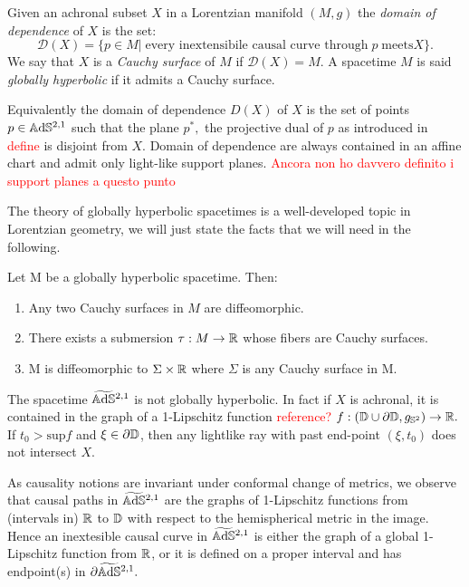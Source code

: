 \begin{definition}
    Given an achronal subset $X$ in a Lorentzian manifold $(M,g)$ the \textit{domain of dependence} of $X$ is the set: 
    \[
        \mathcal{D}(X)=\{p\in M |\;\text{every inextensibile causal curve through}\; p\; \text{meets} X \}.
    \]
    We say that $X$ is a \textit{Cauchy surface} of $M$ if $\mathcal{D}(X)=M$. A spacetime $M$ is said \textit{globally hyperbolic} if it admits a Cauchy surface.
\end{definition}

\begin{observation}
    Equivalently the domain of dependence  $D(X)$ of $X$ is the set of points $p\in\mathbb{A}\mathrm{d}\mathbb{S}^{2,1}$ such that the plane $p^*,$ the projective dual of $p$ as introduced in \textcolor{red}{define} is disjoint from $X.$ Domain of dependence are always contained in an affine chart and admit only light-like support planes. \textcolor{red}{Ancora non ho davvero definito i support planes a questo punto}
\end{observation}

The theory of globally hyperbolic spacetimes is a well-developed topic in Lorentzian geometry, we will just state the facts that we will need in the following. 

\begin{theorem}
    Let M be a globally hyperbolic spacetime. Then:
    \begin{enumerate}
        \item Any two Cauchy surfaces in $M$ are diffeomorphic. 
        \item There exists a submersion $\tau:M\to\mathbb{R}$ whose fibers are Cauchy surfaces.
        \item M is diffeomorphic to $\Sigma\times\mathbb{R}$ where $\Sigma$ is any Cauchy surface in M.
    \end{enumerate}
\end{theorem}

\begin{observation}
    The spacetime $\widetilde{\mathbb{A}\mathrm{d}\mathbb{S}}{}^{2,1}$ is not globally hyperbolic. In fact if $X$ is achronal, it is contained in the graph of a 1-Lipschitz function \textcolor{red}{reference?} $f:(\mathbb{D}\cup\partial\mathbb{D},g_{\mathbb{S}^2})\to\mathbb{R}.$ If $t_0>\text{sup}f$ and $\xi \in \partial\mathbb{D}$, then any lightlike ray with past end-point $(\xi,t_0)$ does not intersect $X.$ 
\end{observation}

\begin{observation}
    As causality notions are invariant under conformal change of metrics, we observe that causal paths in $\widetilde{\mathbb{A}\mathrm{d}\mathbb{S}}{}^{2,1}$ are the graphs of 1-Lipschitz functions from (intervals in) $\mathbb{R}$ to $\mathbb{D}$ with respect to the hemispherical metric in the image. Hence an inextesible causal curve in $\widetilde{\mathbb{A}\mathrm{d}\mathbb{S}}{}^{2,1}$ is either the graph of a global 1-Lipschitz function from $\mathbb{R}$, or it is defined on a proper interval and has endpoint(s) in $\partial\widetilde{\mathbb{A}\mathrm{d}\mathbb{S}}{}^{2,1}.$
\end{observation}

